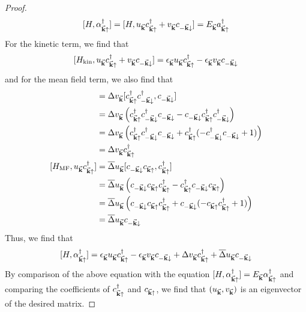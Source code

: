 \begin{proof}
\[[H, \alpha_{\va k\uparrow}^\dagger]= [H, u_{\va k}c_{\va k\uparrow}^\dagger + v_{\va k}c_{-\va k\downarrow}]=E_{\va k}a_{\va k\uparrow}^\dagger\]
For the kinetic term, we find that
\[[H_\text{kin},  u_{\va k}c_{\va k\uparrow}^\dagger + v_{\va k}c_{-\va k\downarrow}]=\epsilon_{\va k}u_{\va k}c^\dagger_{\va k\uparrow} - \epsilon_{\va k}v_{\va k}c_{-\va k\downarrow}\]
and for the mean field term, we also find that
\begin{align*}
[H_\text{MF},  v_{\va k}c_{-\va k\downarrow}] &= \Delta v_{\va k}[c_{\va k\uparrow}^\dagger c_{-\va k\downarrow}^\dagger, c_{-\va k\downarrow}]\\
&=\Delta v_{\va k}\left(c_{\va k\uparrow}^\dagger c_{-\va k\downarrow}^\dagger c_{-\va k\downarrow}-c_{-\va k\downarrow}c_{\va k\uparrow}^\dagger c_{-\va k\downarrow}^\dagger \right)\\
&=\Delta v_{\va k}\left(c_{\va k\uparrow}^\dagger c_{-\va k\downarrow}^\dagger c_{-\va k\downarrow}+c_{\va k\uparrow}^\dagger (-c^\dagger_{-\va k\downarrow} c_{-\va k\downarrow} + 1)\right)\\
&= \Delta v_{\va k}c_{\va k\uparrow}^\dagger \\
[H_\text{MF},  u_{\va k}c_{\va k\uparrow}^\dagger] &= \overline\Delta u_{\va k}[c_{-\va k\downarrow}c_{\va k\uparrow}, c_{\va k\uparrow}^\dagger]\\
&= \overline\Delta u_{\va k}\left(c_{-\va k\downarrow}c_{\va k\uparrow}c_{\va k\uparrow}^\dagger - c_{\va k\uparrow}^\dagger c_{-\va k\downarrow}c_{\va k\uparrow}\right) \\
&= \overline\Delta u_{\va k}\left(c_{-\va k\downarrow}c_{\va k\uparrow}c_{\va k\uparrow}^\dagger +  c_{-\va k\downarrow}(-c_{\va k\uparrow}c_{\va k\uparrow}^\dagger+1)\right) \\
&=\overline\Delta u_{\va k}c_{-\va k\downarrow}
\end{align*}
Thus, we find that
\[[H, \alpha_{\va k\uparrow}^\dagger] = \epsilon_{\va k}u_{\va k}c^\dagger_{\va k\uparrow} - \epsilon_{\va k}v_{\va k}c_{-\va k\downarrow}+\Delta v_{\va k}c_{\va k\uparrow}^\dagger+\overline\Delta u_{\va k}c_{-\va k\downarrow}\]
By comparison of the above equation with the equation $[H,\alpha_{\va k\uparrow}^\dagger]=E_{\va k}\alpha_{\va k\uparrow}^\dagger$ and comparing the coefficients of $c_{\va k\uparrow}^\dagger$ and $c_{\va k\uparrow}$, we find that $(u_{\va k}, v_{\va k})$ is an eigenvector of the desired matrix.
\end{proof}
